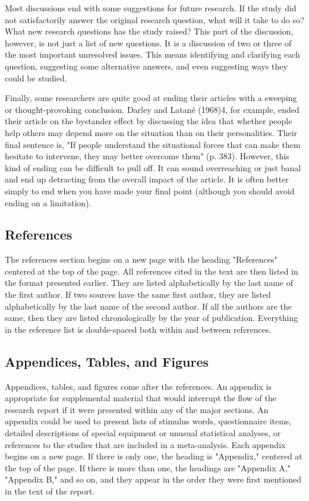 Most discussions end with some suggestions for future research. If the study did not satisfactorily answer the original research question, what will it take to do so? What new research questions has the study raised? This part of the discussion, however, is not just a list of new questions. It is a discussion of two or three of the most important unresolved issues. This means identifying and clarifying each question, suggesting some alternative answers, and even suggesting ways they could be studied.


Finally, some researchers are quite good at ending their articles with a sweeping or thought-provoking conclusion. Darley and Latané (1968)4, for example, ended their article on the bystander effect by discussing the idea that whether people help others may depend more on the situation than on their personalities. Their final sentence is, "If people understand the situational forces that can make them hesitate to intervene, they may better overcome them" (p. 383). However, this kind of ending can be difficult to pull off. It can sound overreaching or just banal and end up detracting from the overall impact of the article. It is often better simply to end when you have made your final point (although you should avoid ending on a limitation).


\subsection{References}

The references section begins on a new page with the heading "References" centered at the top of the page. All references cited in the text are then listed in the format presented earlier. They are listed alphabetically by the last
name of the first author. If two sources have the same first author, they are listed alphabetically by the last name of the second author. If all the authors are the same, then they are listed chronologically by the year of publication. Everything in the reference list is double-spaced both within and between references.


\subsection{Appendices, Tables, and Figures}


Appendices, tables, and figures come after the references. An appendix is appropriate for supplemental material that would interrupt the flow of the research report if it were presented within any of the major sections. An appendix could be used to present lists of stimulus words, questionnaire items, detailed descriptions of special equipment or unusual statistical analyses, or references to the studies that are included in a meta-analysis. Each appendix begins on a new page. If there is only one, the heading is "Appendix," centered at the top of the page. If there is more than one, the headings are "Appendix A," "Appendix B," and so on, and they appear in the order they were first mentioned in the text of the report.


